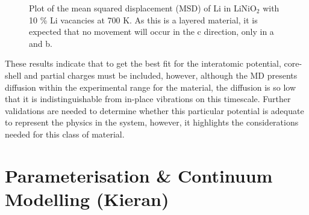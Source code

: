 \documentclass[aps,prb,twocolumn,superscriptaddress,reprint]{revtex4-1}
\begin{document}
\begin{figure}
    \centering
    \caption{\label{fig:MSD_LiNiO2} Plot of the mean squared displacement (MSD) of Li in LiNiO$_2$ with 10 \% Li vacancies at 700 K. As this is a layered material, it is expected that no movement will occur in the c direction, only in a and b.}
\end{figure}

These results indicate that to get the best fit for the interatomic potential, core-shell and partial charges must be included, however, although the MD presents diffusion within the experimental range for the material, the diffusion is so low that it is indistinguishable from in-place vibrations on this timescale. Further validations are needed to determine whether this particular potential is adequate to represent the physics in the system, however, it highlights the considerations needed for this class of material.







\section{Parameterisation \& Continuum Modelling (Kieran)}
\end{document}
